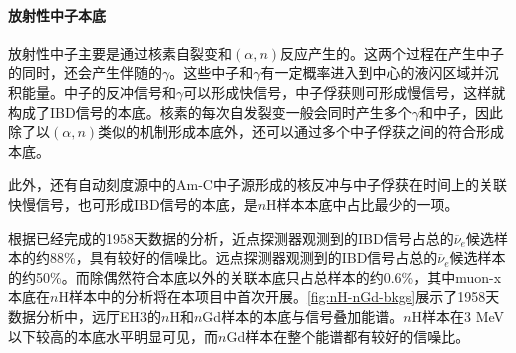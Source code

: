 \documentclass[a4paper,zihao=-4]{article}
\begin{document}
\paragraph{}
\paragraph{放射性中子本底}
放射性中子主要是通过核素自裂变和$(\alpha,n)$反应产生的。这两个过程在产生中子的同时，还会产生伴随的$\gamma$。这些中子和$\gamma$有一定概率进入到中心的液闪区域并沉积能量。中子的反冲信号和$\gamma$可以形成快信号，中子俘获则可形成慢信号，这样就构成了IBD信号的本底。核素的每次自发裂变一般会同时产生多个$\gamma$和中子，因此除了以$(\alpha,n)$类似的机制形成本底外，还可以通过多个中子俘获之间的符合形成本底。

此外，还有自动刻度源中的Am-C中子源形成的核反冲与中子俘获在时间上的关联快慢信号，也可形成IBD信号的本底，是$n$H样本本底中占比最少的一项。

根据已经完成的1958天数据的分析，近点探测器观测到的IBD信号占总的$\overline{\nu}_e$候选样本的约88\%，具有较好的信噪比。远点探测器观测到的IBD信号占总的$\overline{\nu}_e$候选样本的约50\%。而除偶然符合本底以外的关联本底只占总样本的约0.6\%，其中muon-x本底在$n$H样本中的分析将在本项目中首次开展。\cref{fig:nH-nGd-bkgs}展示了1958天数据分析中，远厅EH3的$n$H和$n$Gd样本的本底与信号叠加能谱。$n$H样本在3 MeV以下较高的本底水平明显可见，而$n$Gd样本在整个能谱都有较好的信噪比。
\end{document}

